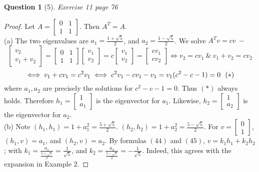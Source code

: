\documentclass[11pt]{article}
\theoremstyle{quest}
\newtheorem*{question}{Question}
\begin{document}
\begin{question}[5]
Exercise 11 page 76
\end{question}
\begin{proof}
Let $A = \begin{bmatrix} 0 & 1 \\ 1 & 1 \end{bmatrix}$. Then $A^T = A$.
\\(a) The two eigenvalues are $a_1 = \frac{1 + \sqrt{5}}{2}$, and $a_2 = \frac{1 - \sqrt{5}}{2}$. We solve $A^Tv = c v \ -$ $$\begin{bmatrix} v_2 \\ v_1 + v_2 \end{bmatrix} = \begin{bmatrix} 0 & 1 \\ 1 & 1 \end{bmatrix} \begin{bmatrix} v_1 \\ v_2 \end{bmatrix} = c \begin{bmatrix} v_1 \\ v_2 \end{bmatrix} = \begin{bmatrix} c v_1 \\ c v_2 \end{bmatrix} \iff v_2 = c v_1\  \& \ v_1 + v_2 = c v_2$$ $$\iff v_1 + c v_1 = c^2 v_1 \iff c^2 v_1 - c v_1 - v_1 = v_1(c^2 - c - 1) = 0 \\ \ \ (*)$$ where $a_1, a_2$ are precisely the solutions for $c^2 - c - 1 = 0$. Thus $(*)$ always holds. Therefore $h_1 = \begin{bmatrix} 1 \\ a_1 \end{bmatrix}$ is the eigenvector for $a_1$. Likewise, $h_2 = \begin{bmatrix} 1 \\ a_2 \end{bmatrix}$ is the eigenvector for $a_2$.
\\(b) Note $(h_1, h_1) = 1 + a_1^2 = \frac{5+\sqrt{5}}{2}$. $(h_2, h_2) = 1 + a_2^2 = \frac{5-\sqrt{5}}{2}$. For $v = \begin{bmatrix} 0 \\ 1 \end{bmatrix}$, $(h_1, v) = a_1$, and $(h_2, v) = a_2$. By formulas $(44)$ and $(45)$, $v = k_1h_1 + k_2h_2$; with $k_1 = \frac{a_1}{\frac{5 + \sqrt{5}}{2}} = \frac{1}{\sqrt{5}}$, and $k_2 = \frac{a_2}{\frac{5 - \sqrt{5}}{2}} = -\frac{1}{\sqrt{5}}$. Indeed, this agrees with the expansion in Example $2$.
\end{proof}
\end{document}
